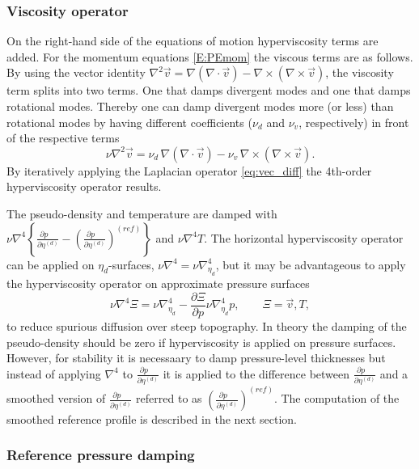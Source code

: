 \documentclass{agujournal}
\begin{document}
\subsubsection{Viscosity operator}\label{sec:hyper}
On the right-hand side of the equations of motion hyperviscosity terms are added. For the momentum equations \eqref{E:PEmom} the viscous terms are as follows. By using the vector identity  $\nabla^2 \vec{v} = \nabla(\nabla \cdot \vec{v}) - \nabla \times (\nabla \times \vec{v}) $, the viscosity term splits into two terms. One that damps divergent modes and one that damps rotational modes. Thereby one can damp divergent modes more (or less) than rotational modes by having different coefficients ($\nu_d$ and $\nu_v$, respectively) in front of the respective terms
 \begin{equation}
  \nu \nabla^2 \vec{v} = \nu_d \, \nabla(\nabla \cdot \vec{v}) -
   \nu_v \,  \nabla \times (\nabla \times \vec{v}).\label{eq:vec_diff}
 \end{equation}
By iteratively applying the Laplacian operator \eqref{eq:vec_diff} the 4th-order hyperviscosity operator results.

The pseudo-density and temperature are damped with $\nu \nabla^4\left\{ \frac{\partial p\quad }{\partial \eta^{(d)}}-\left(\frac{\partial p\quad }{\partial \eta^{(d)}}\right)^{(ref)}\right\}$ and $\nu \nabla^4 T$. The horizontal hyperviscosity operator can be applied on $\eta_d$-surfaces, $\nu \nabla^4=\nu \nabla^4_{\eta_d}$, but it may be advantageous to apply the hyperviscosity operator on approximate pressure surfaces
\begin{equation}
\nu \nabla^4 \Xi =\nu \nabla^4_{\eta_d}-\frac{\partial \Xi}{\partial p}\nu \nabla^4_{\eta_d}p,\qquad \Xi=\vec{v}, T,
\end{equation}
\citep[p.58 in ][]{CAM5} to reduce spurious diffusion over steep topography. In theory the damping of the pseudo-density should be zero if hyperviscosity is applied on pressure surfaces. However, for stability it is necessaary to damp pressure-level thicknesses but instead of applying $\nabla^4$ to $\frac{\partial p\quad }{\partial \eta^{(d)}}$ it is applied to the difference between $\frac{\partial p\quad }{\partial \eta^{(d)}}$ and a smoothed version of $\frac{\partial p\quad }{\partial \eta^{(d)}}$ referred to as $\left( \frac{\partial p\quad }{\partial \eta^{(d)}}\right)^{(ref)}$. The computation of the smoothed reference profile is described in the next section.
\subsubsection{Reference pressure damping}
{\color{red}{Patrick}}
\end{document}
